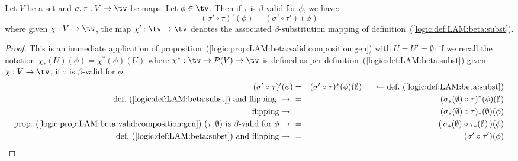 \begin{prop}\label{logic:prop:LAM:beta:valid:composition}
    Let $V$ be a set and $\sigma,\tau:V\to\tv$ be maps. Let $\phi\in\tv$. Then
    if $\tau$ is $\beta$-valid for $\phi$, we have:
        \[
            (\sigma'\circ\tau)' (\phi) = (\sigma'\circ\tau')(\phi)
        \]
    where given $\chi:V\to\tv$, the map $\chi':\tv\to\tv$ denotes the 
    associated $\beta$-substitution mapping of 
    definition~(\ref{logic:def:LAM:beta:subst}).
\end{prop}
\begin{proof}
    This is an immediate application of 
    proposition~(\ref{logic:prop:LAM:beta:valid:composition:gen}) with
    $U=U'=\emptyset$: if we recall
    the notation $\chi_{*}(U)(\phi)=\chi^{*}(\phi)(U)$ where $\chi^{*}:\tv\to
    {\cal P}(V)\to\tv$ is defined as per 
    definition~(\ref{logic:def:LAM:beta:subst}) given $\chi:V\to\tv$, 
    if $\tau$ is $\beta$-valid for $\phi$:
        \begin{eqnarray*}(\sigma'\circ\tau)'(\phi)
            &=&(\sigma'\circ\tau)^{*}(\phi)(\emptyset)
            \mbox{\ \ \ \ \ $\leftarrow$\ def.~(\ref{logic:def:LAM:beta:subst})}\\
            \mbox{def.~(\ref{logic:def:LAM:beta:subst}) and flipping
            \ $\to$\ }
            &=&(\sigma_{*}(\emptyset)\circ\tau)^{*}(\phi)(\emptyset)\\
            \mbox{flipping\ $\to$\ }
            &=&(\sigma_{*}(\emptyset)\circ\tau)_{*}(\emptyset)(\phi)\\
            \mbox{prop.~(\ref{logic:prop:LAM:beta:valid:composition:gen})
            $(\tau,\emptyset)$ is $\beta$-valid for $\phi$\ $\to$\ }
            &=&(\,\sigma_{*}(\emptyset)\circ\tau_{*}(\emptyset)\,)(\phi)\\
            \mbox{def.~(\ref{logic:def:LAM:beta:subst}) and flipping\ $\to$\ }
            &=&(\sigma'\circ\tau')(\phi)
        \end{eqnarray*}
\end{proof}


